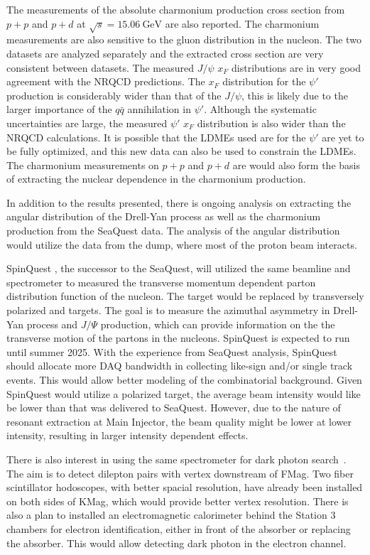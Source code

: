 \documentclass[../main.tex]{subfiles}
\begin{document}
The measurements of the absolute charmonium production cross section from $p+p$
and $p+d$ at $\sqrt{s}=\SI{15.06}{\GeV}$ are also reported. The charmonium measurements
are also sensitive to the gluon distribution in the nucleon. The two datasets
are analyzed separately and the extracted cross section are very consistent between
datasets. The measured
$J/\psi$ $x_F$ distributions are in very good agreement with the NRQCD predictions.
The $x_F$ distribution for the $\psi'$ production is considerably wider than that of the
$J/\psi$, this is likely due to the larger importance of the $q\bar{q}$ annihilation
in $\psi'$. Although the systematic uncertainties are large, the measured $\psi'$
$x_F$ distribution is also wider than the NRQCD calculations. It is possible that
the LDMEs used are for the $\psi'$ are yet to be fully optimized, and this new
data can also be used to constrain the LDMEs.
The charmonium measurements on $p+p$ and $p+d$ are would also form the basis of
extracting the nuclear dependence in the charmonium production.

In addition to the results presented, there is ongoing analysis on extracting
the angular distribution of the Drell-Yan process as well as the charmonium
production from the SeaQuest data. The analysis of the angular distribution would
utilize the data from the dump, where most of the proton beam interacts.

SpinQuest \cite{geesaman2014}, the successor to the SeaQuest, will utilized the same beamline and
spectrometer to measured the transverse momentum dependent parton distribution
function of the nucleon. The target would be replaced by transversely polarized 
and  targets. The goal is to measure the azimuthal asymmetry in
Drell-Yan process and $J/\Psi$ production, which can provide information on the
the transverse motion of the partons in the nucleons.
SpinQuest is expected to run until summer 2025. With the experience
from SeaQuest analysis, SpinQuest should allocate more DAQ bandwidth in collecting 
like-sign and/or single track events. This would allow better modeling of the combinatorial 
background. Given SpinQuest would utilize a polarized target,
the average beam intensity would like be lower than that was delivered to SeaQuest.
However, due to the nature of resonant extraction at Main Injector,
the beam quality might be lower at lower intensity, resulting in larger intensity dependent effects.

There is also interest in using the same spectrometer for dark photon search~\cite{apyan2022}. 
The aim is to detect dilepton pairs with vertex downstream of FMag.
Two fiber scintillator hodoscopes, with better spacial resolution, have already been installed
on both sides of KMag, which would provide better vertex resolution.
There is also a plan to installed an electromagnetic calorimeter behind the
Station 3 chambers for electron identification, either in front of the absorber or replacing the absorber.
This would allow detecting dark photon in the electron
channel.

\ifSubfilesClassLoaded{ \printbibliography[heading=bibintoc,title={References}]}{}
\end{document}
